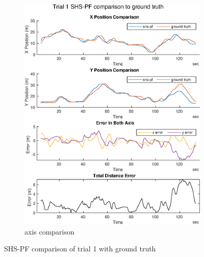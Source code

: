 \begin{figure}[H]
\begin{subfigure}[t]{.45\textwidth}
		\includegraphics[width=\linewidth]{images/20201029_1603_shs-pf_trial_1_1}
		\caption{axis comparison}
		\label{fig:shspf_trial1_comparison}
	\end{subfigure}
	\caption{SHS-PF comparison of trial 1 with ground truth}
	\label{fig:shspf_trial1_shs_gt_comparison}
\end{figure}

